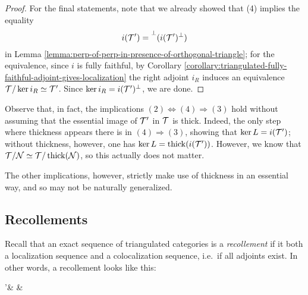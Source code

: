 \begin{proof}


For the final statements, note that we already showed that (4) implies the equality
\[ i(\mathcal{T}') = \prescript{\perp}{}{(i(\ensuremath{\mathcal{T}}')^\perp)}\]
in Lemma \ref{lemma:perp-of-perp-in-presence-of-orthogonal-triangle}; for the equivalence, since \(i\) is fully faithful, by Corollary \ref{corollary:triangulated-fully-faithful-adjoint-gives-localization} the right
adjoint \(i_R\) induces an equivalence \(\mathcal{T}/\ker{i_R} \simeq \mathcal{T}'\). Since \(\ker{i_R} = i(\mathcal{T}')^\perp\), we are done.
\end{proof}
\begin{remark}
	Observe that, in fact, the implications \((2)\Leftrightarrow(4)\Rightarrow(3)\) hold without assuming that the essential image of \(\mathcal{T}'\) in \(\mathcal{T}\) is thick. Indeed,
	the only step where thickness appears there is in \((4)\Rightarrow(3)\), showing that \(\ker{L} = i(\mathcal{T}')\); without thickness, however, one has \(\ker{L} = \operatorname{thick}(i(\mathcal{T}'))\). However,
	we know that \(\mathcal{T}/\mathcal{N} \simeq \mathcal{T}/\operatorname{thick}(\mathcal{N})\), so this actually does not matter.

	The other implications, however, strictly make use of thickness in an essential way, and so may not be naturally generalized.
\end{remark}

\subsection{Recollements}\label{subsection:recollements}
Recall that an exact sequence of triangulated categories is a \emph{recollement} if it both a localization sequence and a colocalization sequence, i.e.\ if all adjoints exist.
In other words, a recollement looks like this:
\begin{diagram*}[column sep=large]
	\calT'\ar[r,"i" description,""{below,name=A},""{above,name=AA}] &
		\calT \ar[r,"p" description,""{below,name=C},""{above,name=CC}]\ar[l,bend left,shift left,"i_R",""{above,name=B}]\ar[l,bend right,shift right,"i_L"',""{below,name=BB}] &
		 \ar[l,bend left,shift left,"p_R",""{above,name=D}]\ar[l,bend right,shift right,"p_L"',""{below,name=DD}]
		\ar[from=B,to=A,symbol=\vdash]\ar[from=D,to=C,symbol=\vdash]
		\ar[from=AA,to=BB,symbol=\vdash]\ar[from=CC,to=DD,symbol=\vdash]
\end{diagram*}


